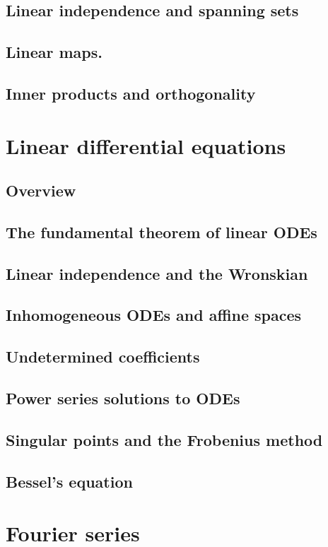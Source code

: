 \documentclass{article}
\begin{document}
\subsection{Linear independence and spanning sets}
\subsection{Linear maps.}
\subsection{Inner products and orthogonality}
\pagebreak
\section{Linear differential equations}
\subsection*{Overview}
\subsection{The fundamental theorem of linear ODEs}
\subsection{Linear independence and the Wronskian}
\subsection{Inhomogeneous ODEs and affine spaces}
\subsection{Undetermined coefficients}
\subsection{Power series solutions to ODEs}
\subsection{Singular points and the Frobenius method}
\subsection{Bessel's equation}
\pagebreak
\section{Fourier series}
\end{document}
